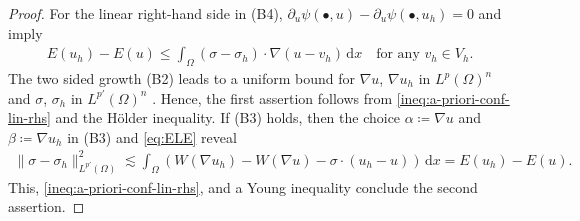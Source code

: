 \documentclass[a4paper]{amsart}
\numberwithin{equation}{section}
\renewcommand{\d}[1]{\,\mathrm{d}#1}
\theoremstyle{remark}
\begin{document}
\begin{proof}
    For the linear right-hand side in (B4), 
    $\partial_u \psi(\bullet,u) - \partial_u \psi(\bullet,u_h) = 0$ 
    and  imply
    \begin{align}\label{ineq:a-priori-conf-lin-rhs}
        E(u_h) - E(u) \leq
        \int_\Omega (\sigma - \sigma_h) \cdot \nabla (u - v_h) \d{x} \quad\text{for any } v_h \in V_h.
    \end{align}
    The two sided growth (B2) leads to a uniform bound for $\nabla u$, $\nabla u_h$ in $L^p(\Omega)^n$ and $\sigma$, $\sigma_h$ in $L^{p'}(\Omega)^n$ \cite{GlowinskiMarrocco1975, CPlechac1997}. Hence, the first assertion follows from \eqref{ineq:a-priori-conf-lin-rhs} and the H\"older inequality.
    If (B3) holds, then the choice $\alpha \coloneqq \nabla u$ and $\beta \coloneqq \nabla u_h$ in (B3) and \eqref{eq:ELE} reveal
    \begin{align*}
        \|\sigma - \sigma_h\|^2_{L^{p'}(\Omega)} \lesssim \int_{\Omega} (W(\nabla u_h) - W(\nabla u) - \sigma \cdot (u_h - u)) \d{x} = E(u_h) - E(u).
    \end{align*}
    This, \eqref{ineq:a-priori-conf-lin-rhs}, and a Young inequality conclude the second assertion.
\end{proof}
\end{document}
